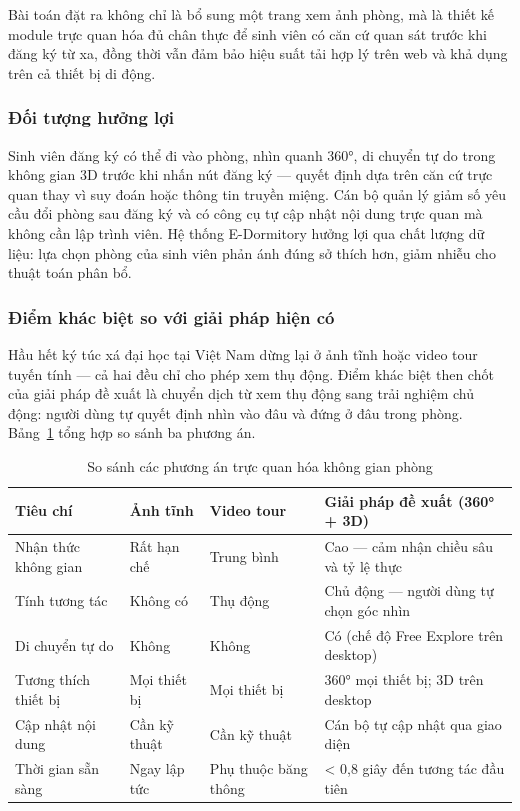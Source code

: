 \documentclass[../DoAn.tex]{subfiles}
\begin{document}
Bài toán đặt ra không chỉ là bổ sung một trang xem ảnh phòng, mà là thiết kế
module trực quan hóa đủ chân thực để sinh viên có căn cứ quan sát trước khi
đăng ký từ xa, đồng thời vẫn đảm bảo hiệu suất tải hợp lý trên web và khả dụng
trên cả thiết bị di động.

\subsubsection{Đối tượng hưởng lợi}

Sinh viên đăng ký có thể đi vào phòng, nhìn quanh 360°, di
chuyển tự do trong không gian 3D trước khi nhấn nút đăng ký --- quyết định
dựa trên căn cứ trực quan thay vì suy đoán hoặc thông tin truyền miệng. Cán bộ
quản lý giảm số yêu cầu đổi phòng sau đăng ký và có công cụ tự cập nhật nội
dung trực quan mà không cần lập trình viên. Hệ thống E-Dormitory hưởng lợi qua
chất lượng dữ liệu: lựa chọn phòng của sinh viên phản ánh đúng sở thích hơn,
giảm nhiễu cho thuật toán phân bổ.

\subsubsection{Điểm khác biệt so với giải pháp hiện có}

Hầu hết ký túc xá đại học tại Việt Nam dừng lại ở ảnh tĩnh hoặc video tour
tuyến tính --- cả hai đều chỉ cho phép xem thụ động. Điểm khác biệt then chốt
của giải pháp đề xuất là chuyển dịch từ xem thụ động sang trải nghiệm
chủ động: người dùng tự quyết định nhìn vào đâu và đứng ở đâu trong phòng.
Bảng~\ref{tab:viz_comparison} tổng hợp so sánh ba phương án.

\begin{table}[H]
\centering
\caption{So sánh các phương án trực quan hóa không gian phòng}
\label{tab:viz_comparison}
\small
\begin{tabular}{|p{2.8cm}|p{2.6cm}|p{2.6cm}|p{5.2cm}|}
\hline
\textbf{Tiêu chí} & \textbf{Ảnh tĩnh} & \textbf{Video tour} & \textbf{Giải pháp đề xuất (360° + 3D)} \\
\hline
Nhận thức không gian & Rất hạn chế & Trung bình & Cao --- cảm nhận chiều sâu và tỷ lệ thực \\
\hline
Tính tương tác & Không có & Thụ động & Chủ động --- người dùng tự chọn góc nhìn \\
\hline
Di chuyển tự do & Không & Không & Có (chế độ Free Explore trên desktop) \\
\hline
Tương thích thiết bị & Mọi thiết bị & Mọi thiết bị & 360° mọi thiết bị; 3D trên desktop \\
\hline
Cập nhật nội dung & Cần kỹ thuật & Cần kỹ thuật & Cán bộ tự cập nhật qua giao diện \\
\hline
Thời gian sẵn sàng & Ngay lập tức & Phụ thuộc băng thông & < 0,8 giây đến tương tác đầu tiên \\
\hline
\end{tabular}
\end{table}
\end{document}
